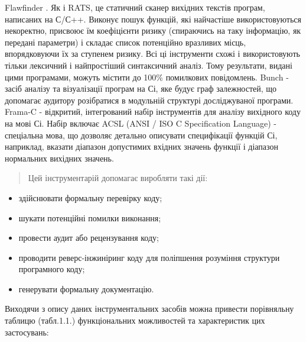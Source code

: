\documentclass[oneside,final,14pt]{extreport}
\begin{document}
Flawfinder . Як і RATS, це статичний сканер вихідних текстів програм, написаних на С/С++. Виконує пошук функцій, які найчастіше використовуються некоректно, присвоює їм коефіцієнти ризику (спираючись на таку інформацію, як передані параметри) і складає список потенційно вразливих місць, впорядковуючи їх за ступенем ризику.
Всі ці інструменти схожі і використовують тільки лексичний і найпростіший синтаксичний аналіз. Тому результати, видані цими програмами, можуть містити до 100\% помилкових повідомлень.
Bunch - засіб аналізу та візуалізації програм на Сі, яке будує граф залежностей, що допомагає аудитору розібратися в модульній структурі досліджуваної програми.
Frama-C - відкритий, інтегрований набір інструментів для аналізу вихідного коду на мові Сі. Набір включає ACSL (ANSI / ISO C Specification Language) - спеціальна мова, що дозволяє детально описувати специфікації функцій Сі, наприклад, вказати діапазон допустимих вхідних значень функції і діапазон нормальних вихідних значень.
\begin{quote}

Цей інструментарій допомагає виробляти такі дії:
\end{quote}
\begin{itemize}
\item {} 
здійснювати формальну перевірку коду;

\item {} 
шукати потенційні помилки виконання;

\item {} 
провести аудит або рецензування коду;

\item {} 
проводити реверс-інжиніринг коду для поліпшення розуміння структури програмного коду;

\item {} 
генерувати формальну документацію.

\end{itemize}

Виходячи з опису даних інструментальних засобів можна привести порівняльну таблицю (табл.1.1.) функціональних можливостей та характеристик цих застосувань:
\end{document}
